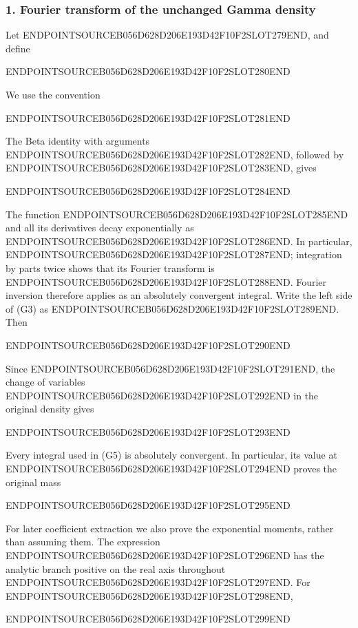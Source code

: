 \subsubsection{1. Fourier transform of the unchanged Gamma density}\label{endpoint-gamma_review--fourier-transform-of-the-unchanged-gamma-density}

Let ENDPOINTSOURCEB056D628D206E193D42F10F2SLOT279END, and define

ENDPOINTSOURCEB056D628D206E193D42F10F2SLOT280END

We use the convention

ENDPOINTSOURCEB056D628D206E193D42F10F2SLOT281END

The Beta identity with arguments ENDPOINTSOURCEB056D628D206E193D42F10F2SLOT282END, followed by ENDPOINTSOURCEB056D628D206E193D42F10F2SLOT283END, gives

ENDPOINTSOURCEB056D628D206E193D42F10F2SLOT284END

The function ENDPOINTSOURCEB056D628D206E193D42F10F2SLOT285END and all its derivatives decay exponentially as ENDPOINTSOURCEB056D628D206E193D42F10F2SLOT286END. In particular, ENDPOINTSOURCEB056D628D206E193D42F10F2SLOT287END; integration by parts twice shows that its Fourier transform is ENDPOINTSOURCEB056D628D206E193D42F10F2SLOT288END. Fourier inversion therefore applies as an absolutely convergent integral. Write the left side of (G3) as ENDPOINTSOURCEB056D628D206E193D42F10F2SLOT289END. Then

ENDPOINTSOURCEB056D628D206E193D42F10F2SLOT290END

Since ENDPOINTSOURCEB056D628D206E193D42F10F2SLOT291END, the change of variables ENDPOINTSOURCEB056D628D206E193D42F10F2SLOT292END in the original density gives

ENDPOINTSOURCEB056D628D206E193D42F10F2SLOT293END

Every integral used in (G5) is absolutely convergent. In particular, its value at ENDPOINTSOURCEB056D628D206E193D42F10F2SLOT294END proves the original mass

ENDPOINTSOURCEB056D628D206E193D42F10F2SLOT295END

For later coefficient extraction we also prove the exponential moments, rather than assuming them. The expression ENDPOINTSOURCEB056D628D206E193D42F10F2SLOT296END has the analytic branch positive on the real axis throughout ENDPOINTSOURCEB056D628D206E193D42F10F2SLOT297END. For ENDPOINTSOURCEB056D628D206E193D42F10F2SLOT298END,

ENDPOINTSOURCEB056D628D206E193D42F10F2SLOT299END

